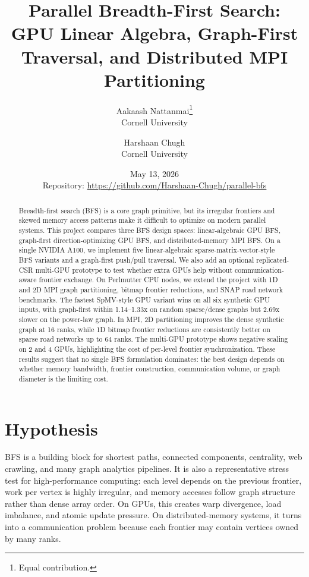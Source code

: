 \documentclass[11pt]{article}
\title{Parallel Breadth-First Search: GPU Linear Algebra, Graph-First Traversal, and Distributed MPI Partitioning}
\author{Aakaash Nattanmai\thanks{Equal contribution.}\\Cornell University \and Harshaan Chugh\footnotemark[1]\\Cornell University}
\date{May 13, 2026\\[0.35em]\small Repository: \url{https://github.com/Harshaan-Chugh/parallel-bfs}}
\begin{document}
\maketitle

\begin{abstract}
Breadth-first search (BFS) is a core graph primitive, but its irregular
frontiers and skewed memory access patterns make it difficult to optimize on
modern parallel systems. This project compares three BFS design spaces:
linear-algebraic GPU BFS, graph-first direction-optimizing GPU BFS, and
distributed-memory MPI BFS. On a single NVIDIA A100, we implement five
linear-algebraic sparse-matrix-vector-style BFS variants and a graph-first
push/pull traversal. We also add an optional replicated-CSR multi-GPU
prototype to test whether extra GPUs help without communication-aware frontier
exchange. On Perlmutter CPU nodes, we extend the project with 1D and 2D MPI
graph partitioning, bitmap frontier reductions, and SNAP road network
benchmarks. The fastest SpMV-style GPU variant wins on all six
synthetic GPU inputs, with graph-first within 1.14--1.33x on random
sparse/dense graphs but 2.69x slower on the power-law graph. In MPI, 2D
partitioning improves the dense synthetic graph at 16 ranks, while 1D bitmap
frontier reductions are consistently better on sparse road networks up to 64
ranks. The multi-GPU prototype shows negative scaling on 2 and 4 GPUs,
highlighting the cost of per-level frontier synchronization. These results
suggest that no single BFS formulation dominates: the best design depends on
whether memory bandwidth, frontier construction, communication volume, or graph
diameter is the limiting cost.
\end{abstract}

\section{Hypothesis}

BFS is a building block for shortest paths, connected components, centrality,
web crawling, and many graph analytics pipelines. It is also a representative
stress test for high-performance computing: each level depends on the previous
frontier, work per vertex is highly irregular, and memory accesses follow graph
structure rather than dense array order. On GPUs, this creates warp divergence,
load imbalance, and atomic update pressure. On distributed-memory systems, it
turns into a communication problem because each frontier may contain vertices
owned by many ranks.
\end{document}
